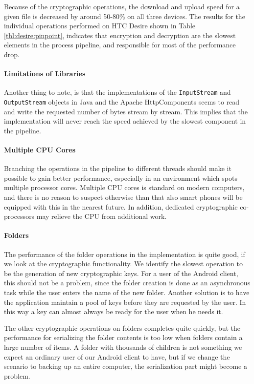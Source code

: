 \documentclass[pdftex,english,10pt,b5paper,twoside]{book}
\begin{document}
Because of the cryptographic operations, the download and upload speed for a
given file is decreased by around 50-80\% on all three devices. The results for
the individual operations performed on HTC Desire shown in Table
\ref{tbl:desire:pinpoint}, indicates that encryption and decryption are the
slowest elements in the process pipeline, and responsible for most of the
performance drop.

\paragraph{Limitations of Libraries} Another thing to note, is that the
implementations of the \texttt{InputStream} and \texttt{OutputStream} objects
in Java and the Apache HttpComponents seems to read and write the requested
number of bytes stream by stream. This implies that the implementation will
never reach the speed achieved by the slowest component in the pipeline.

\paragraph{Multiple CPU Cores} Branching the operations in the pipeline to
different threads should make it possible to gain better performance,
especially in an environment which spots multiple processor cores. Multiple
\ac{CPU} cores is standard on modern computers, and there is no reason to
suspect otherwise than that also smart phones will be equipped with this in the
nearest future. In addition, dedicated cryptographic co-processors may
relieve the \ac{CPU} from additional work.

\paragraph{Folders} The performance of the folder operations in the
implementation is quite good, if we look at the cryptographic
functionality. We identify the slowest operation to be the generation of
new cryptographic keys. For a user of the Android client, this should not be a
problem, since the folder creation is done as an asynchronous task while the
user enters the name of the new folder. Another solution is to have the
application maintain a pool of keys before they are requested by the user. In
this way a key can almost always be ready for the user when he needs it.

The other cryptographic operations on folders completes quite quickly, but the
performance for serializing the folder contents is too low when folders contain
a large number of items. A folder with thousands of children is not
something we expect an ordinary user of our Android client to have, but if we
change the scenario to backing up an entire computer, the serialization part
might become a problem.
\end{document}
